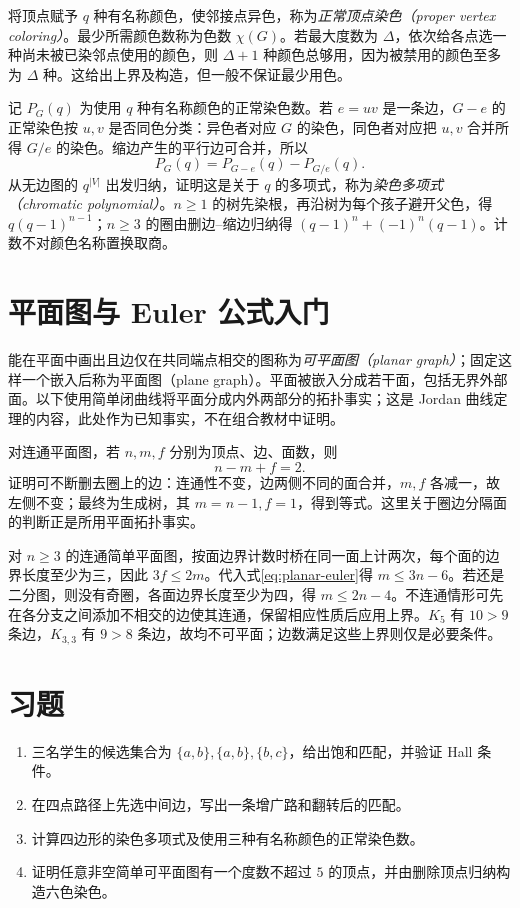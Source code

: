 将顶点赋予 $q$ 种有名称颜色，使邻接点异色，称为\emph{正常顶点染色（proper vertex coloring）}。最少所需颜色数称为色数 $\chi(G)$。若最大度数为 $\Delta$，依次给各点选一种尚未被已染邻点使用的颜色，则 $\Delta+1$ 种颜色总够用，因为被禁用的颜色至多为 $\Delta$ 种。这给出上界及构造，但一般不保证最少用色。

记 $P_G(q)$ 为使用 $q$ 种有名称颜色的正常染色数。若 $e=uv$ 是一条边，$G-e$ 的正常染色按 $u,v$ 是否同色分类：异色者对应 $G$ 的染色，同色者对应把 $u,v$ 合并所得 $G/e$ 的染色。缩边产生的平行边可合并，所以
\[
 P_G(q)=P_{G-e}(q)-P_{G/e}(q).
\]
从无边图的 $q^{|V|}$ 出发归纳，证明这是关于 $q$ 的多项式，称为\emph{染色多项式（chromatic polynomial）}。$n\ge1$ 的树先染根，再沿树为每个孩子避开父色，得 $q(q-1)^{n-1}$；$n\ge3$ 的圈由删边--缩边归纳得 $(q-1)^n+(-1)^n(q-1)$。计数不对颜色名称置换取商。

\section{平面图与 Euler 公式入门}

能在平面中画出且边仅在共同端点相交的图称为\emph{可平面图（planar graph）}；固定这样一个嵌入后称为平面图（plane graph）。平面被嵌入分成若干面，包括无界外部面。以下使用简单闭曲线将平面分成内外两部分的拓扑事实；这是 Jordan 曲线定理的内容，此处作为已知事实，不在组合教材中证明。

对连通平面图，若 $n,m,f$ 分别为顶点、边、面数，则
\begin{equation}
 n-m+f=2.
 \label{eq:planar-euler}
\end{equation}
证明可不断删去圈上的边：连通性不变，边两侧不同的面合并，$m,f$ 各减一，故左侧不变；最终为生成树，其 $m=n-1,f=1$，得到等式。这里关于圈边分隔面的判断正是所用平面拓扑事实。

对 $n\ge3$ 的连通简单平面图，按面边界计数时桥在同一面上计两次，每个面的边界长度至少为三，因此 $3f\le2m$。代入式\eqref{eq:planar-euler}得 $m\le3n-6$。若还是二分图，则没有奇圈，各面边界长度至少为四，得 $m\le2n-4$。不连通情形可先在各分支之间添加不相交的边使其连通，保留相应性质后应用上界。$K_5$ 有 $10>9$ 条边，$K_{3,3}$ 有 $9>8$ 条边，故均不可平面；边数满足这些上界则仅是必要条件。

\section{习题}
\begin{enumerate}
  \item\label{ex:matching-coloring-1} 三名学生的候选集合为 $\{a,b\},\{a,b\},\{b,c\}$，给出饱和匹配，并验证 Hall 条件。
  \item\label{ex:matching-coloring-2} 在四点路径上先选中间边，写出一条增广路和翻转后的匹配。
  \item\label{ex:matching-coloring-3} 计算四边形的染色多项式及使用三种有名称颜色的正常染色数。
  \item\label{ex:matching-coloring-4} 证明任意非空简单可平面图有一个度数不超过 $5$ 的顶点，并由删除顶点归纳构造六色染色。
\end{enumerate}

